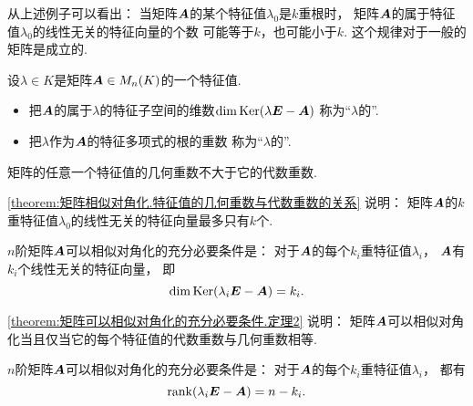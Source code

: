 从上述例子可以看出：
当矩阵\(\boldsymbol{A}\)的某个特征值\(\lambda_0\)是\(k\)重根时，
矩阵\(\boldsymbol{A}\)的属于特征值\(\lambda_0\)的线性无关的特征向量的个数
可能等于\(k\)，也可能小于\(k\).
这个规律对于一般的矩阵是成立的.

\begin{definition}
设\(\lambda \in K\)是矩阵\(\boldsymbol{A} \in M_n(K)\)的一个特征值.
\begin{itemize}
	\item 把\(\boldsymbol{A}\)的属于\(\lambda\)的特征子空间的维数\(\dim\operatorname{Ker}(\lambda\boldsymbol{E}-\boldsymbol{A})\)
	称为“\(\lambda\)的”.
	\item 把\(\lambda\)作为\(\boldsymbol{A}\)的特征多项式的根的重数
	称为“\(\lambda\)的”.
\end{itemize}
\end{definition}
\begin{theorem}\label{theorem:矩阵相似对角化.特征值的几何重数与代数重数的关系}
矩阵的任意一个特征值的几何重数不大于它的代数重数.
\end{theorem}
\begin{remark}
\cref{theorem:矩阵相似对角化.特征值的几何重数与代数重数的关系} 说明：
矩阵\(\boldsymbol{A}\)的\(k\)重特征值\(\lambda_0\)的线性无关的特征向量最多只有\(k\)个.
\end{remark}

\begin{theorem}\label{theorem:矩阵可以相似对角化的充分必要条件.定理2}
\(n\)阶矩阵\(\boldsymbol{A}\)可以相似对角化的充分必要条件是：
对于\(\boldsymbol{A}\)的每个\(k_i\)重特征值\(\lambda_i\)，
\(\boldsymbol{A}\)有\(k_i\)个线性无关的特征向量，
即\begin{equation*}
	\dim\operatorname{Ker}(\lambda_i\boldsymbol{E}-\boldsymbol{A}) = k_i.
\end{equation*}
\end{theorem}
\begin{remark}
\cref{theorem:矩阵可以相似对角化的充分必要条件.定理2} 说明：
矩阵\(\boldsymbol{A}\)可以相似对角化当且仅当它的每个特征值的代数重数与几何重数相等.
\end{remark}

\begin{corollary}\label{theorem:矩阵可以相似对角化的充分必要条件.定理3}
\(n\)阶矩阵\(\boldsymbol{A}\)可以相似对角化的充分必要条件是：
对于\(\boldsymbol{A}\)的每个\(k_i\)重特征值\(\lambda_i\)，
都有\begin{equation*}
	\rank(\lambda_i\boldsymbol{E}-\boldsymbol{A}) = n-k_i.
\end{equation*}
\end{corollary}

